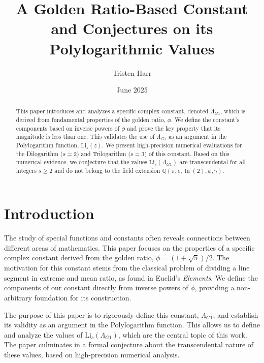 \documentclass{amsart}
\theoremstyle{plain}
\theoremstyle{definition}
\theoremstyle{remark}
\newcommand{\LambdaG}{\Lambda_{G1}}
\begin{document}
\title[A Golden Ratio Constant and its Polylogarithmic Values]{A Golden Ratio-Based Constant and Conjectures on its Polylogarithmic Values}
\author{Tristen Harr}
\date{June 2025}

\begin{abstract}
This paper introduces and analyzes a specific complex constant, denoted $\LambdaG$, which is derived from fundamental properties of the golden ratio, $\phi$. We define the constant's components based on inverse powers of $\phi$ and prove the key property that its magnitude is less than one. This validates the use of $\LambdaG$ as an argument in the Polylogarithm function, $\mathrm{Li}_s(z)$. We present high-precision numerical evaluations for the Dilogarithm ($s=2$) and Trilogarithm ($s=3$) of this constant. Based on this numerical evidence, we conjecture that the values $\mathrm{Li}_s(\LambdaG)$ are transcendental for all integers $s \ge 2$ and do not belong to the field extension $\mathbb{Q}(\pi, e, \ln(2), \phi, \gamma)$.
\end{abstract}

\maketitle

\section{Introduction}
The study of special functions and constants often reveals connections between different areas of mathematics. This paper focuses on the properties of a specific complex constant derived from the golden ratio, $\phi = (1+\sqrt{5})/2$. The motivation for this constant stems from the classical problem of dividing a line segment in extreme and mean ratio, as found in Euclid's \textit{Elements}. We define the components of our constant directly from inverse powers of $\phi$, providing a non-arbitrary foundation for its construction.

The purpose of this paper is to rigorously define this constant, $\LambdaG$, and establish its validity as an argument in the Polylogarithm function. This allows us to define and analyze the values of $\mathrm{Li}_s(\LambdaG)$, which are the central topic of this work. The paper culminates in a formal conjecture about the transcendental nature of these values, based on high-precision numerical analysis.

\end{document}
